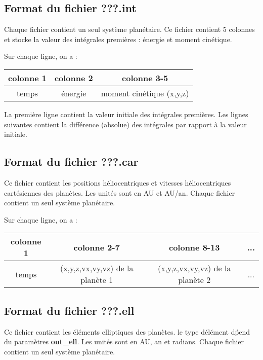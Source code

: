 \documentclass[11pt]{article}
\begin{document}
\subsection{Format du fichier {\bf ???.int} }

Chaque fichier contient un seul syst\`eme plan\'etaire.
Ce fichier contient 5 colonnes et stocke la valeur des int\'egrales premi\`eres  : \'energie et moment cin\'etique.

Sur chaque ligne, on a : 

\begin{tabular}{|c|c|c|} \hline
colonne 1 &  colonne 2 & colonne 3-5 \\ \hline
temps & \'energie & moment cin\'etique (x,y,z)\\    \hline
\end{tabular}

La premi\`ere ligne contient la valeur initiale des int\'egrales premi\`eres. Les lignes suivantes contient la différence (absolue) des intégrales par rapport à la valeur initiale.


\subsection{Format du fichier {\bf ???.car} }

Ce fichier contient les positions h\'eliocentriques et vitesses h\'eliocentriques cart\'esiennes des plan\`etes. Les unit\'es sont en AU et AU/an.
Chaque fichier contient un seul syst\`eme plan\'etaire.


Sur chaque ligne, on a : 

\begin{tabular}{|c|c|c|c|} \hline
colonne 1 &   colonne 2-7 & colonne 8-13 & ... \\ \hline
temps & (x,y,z,vx,vy,vz) de la plan\`ete 1  & (x,y,z,vx,vy,vz) de la plan\`ete 2 & ... \\    \hline
\end{tabular}

\subsection{Format du fichier {\bf ???.ell} }

Ce fichier contient les \'el\'ements elliptiques des plan\`etes. le type d\'el\'ement d\'pend du param\`etres  {\bf out\_ell}. Les unit\'es sont en AU, an et radians.
Chaque fichier contient un seul syst\`eme plan\'etaire.
\end{document}
